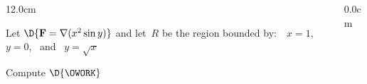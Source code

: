 \begin{frame}
\begin{columns}\begin{column}{12.0cm}

\scriptsize

\EX Let $\D{{\bf F} = \nabla(x^2\sin y)}$ and let\, $R$ be the region bounded by: \,\, $x=1$, \, $y=0$, \, and \, $y=\sqrt{x}$

\vspace{0.2cm}

Compute \quad $\D{\OWORK}$

\vspace{0.2cm}

\vspace{7.2cm}

\end{column}\begin{column}{0.0cm}\end{column}\end{columns}
\end{frame}


